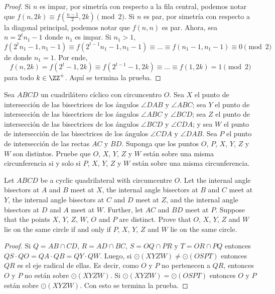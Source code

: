\begin{proof}
	Si $n$ es impar, por simetría con respecto a la fila central, podemos notar que $f(n,2k)\equiv f(\frac{n-1}{2},2k)\pmod 2$. Si $n$ es par, por simetría con respecto a la diagonal principal, podemos notar que $f(n,n)$ es par. Ahora, sea $n=2^tn_1-1$ donde $n_1$ es impar. Si $n_1>1$,
	\[f(2^tn_1-1,n_1-1)\equiv f(2^{t-1}n_1-1,n_1-1)\equiv\dots\equiv f(n_1-1,n_1-1)\equiv 0\pmod 2\]
	de donde $n_1=1$. Por ende,
	\[f(n,2k)=f(2^t-1,2k)\equiv f(2^{t-1}-1,2k)\equiv\dots\equiv f(1,2k)=1\pmod 2\]
	para todo $k\in\ZZ^+$. Aquí se termina la prueba.
\end{proof}

\begin{probEG}[EGMO 2022/6]
	Sea $ABCD$ un cuadrilátero cíclico con circuncentro $O$. Sea $X$ el punto de intersección de las bisectrices de los ángulos $\angle DAB$ y $\angle ABC$; sea $Y$ el punto de intersección de las bisectrices de los ángulos $\angle ABC$ y $\angle BCD$; sea $Z$ el punto de intersección de las bisectrices de los ángulos $\angle BCD$ y $\angle CDA$; y sea $W$ el punto de intersección de las bisectrices de los ángulos $\angle CDA$ y $\angle DAB$. Sea $P$ el punto de intersección de las rectas $AC$ y $BD$. Suponga que los puntos $O$, $P$, $X$, $Y$, $Z$ y $W$ son distintos. Pruebe que $O$, $X$, $Y$, $Z$ y $W$ están sobre una misma circunferencia si y solo si $P$, $X$, $Y$, $Z$ y $W$ están sobre una misma circunferencia.
	\begin{hint}
		Let $ABCD$ be a cyclic quadrilateral with circumcentre $O$. Let the internal angle bisectors at $A$ and $B$ meet at $X$, the internal angle bisectors at $B$ and $C$ meet at $Y$, the internal angle bisectors at $C$ and $D$ meet at $Z$, and the internal angle bisectors at $D$ and $A$ meet at $W$. Further, let $AC$ and $BD$ meet at $P$. Suppose that the points $X$, $Y$, $Z$, $W$, $O$ and $P$ are distinct. Prove that $O$, $X$, $Y$, $Z$ and $W$ lie on the same circle if and only if $P$, $X$, $Y$, $Z$ and $W$ lie on the same circle.
	\end{hint}
\end{probEG}

\begin{proof}
	Si $Q=AB\cap CD$, $R=AD\cap BC$, $S=OQ\cap PR$ y $T=OR\cap PQ$ entonces $QS\cdot QO=QA\cdot QB=QY\cdot QW$. Luego, si $\odot(XYZW)\neq\odot(OSPT)$ entonces $QR$ es el eje radical de ellas. Es decir, como $O$ y $P$ no pertenecen a $QR$, entonces $O$ y $P$ no están sobre $\odot(XYZW)$. Si $\odot(XYZW)=\odot(OSPT)$ entonces $O$ y $P$ están sobre $\odot(XYZW)$. Con esto se termina la prueba.
\end{proof}
